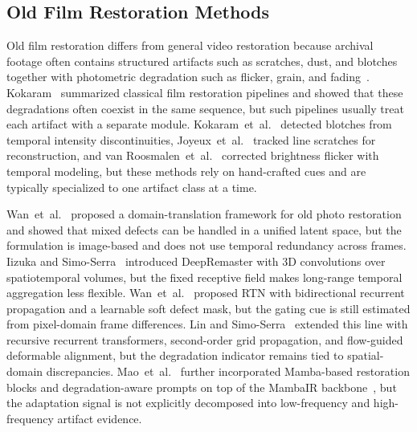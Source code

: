 \documentclass[applsci,article,submit,pdftex,moreauthors]{Definitions/mdpi}
\begin{document}
\subsection{Old Film Restoration Methods}

Old film restoration differs from general video restoration because archival footage often contains structured artifacts such as scratches, dust, and blotches together with photometric degradation such as flicker, grain, and fading~\cite{kokaram1998motion}. Kokaram~\cite{kokaram1998motion} summarized classical film restoration pipelines and showed that these degradations often coexist in the same sequence, but such pipelines usually treat each artifact with a separate module. Kokaram~et~al.~\cite{kokaram1995blotch} detected blotches from temporal intensity discontinuities, Joyeux~et~al.~\cite{joyeux2001scratch} tracked line scratches for reconstruction, and van Roosmalen~et~al.~\cite{vanroosmalen1999flicker} corrected brightness flicker with temporal modeling, but these methods rely on hand-crafted cues and are typically specialized to one artifact class at a time.

Wan~et~al.~\cite{wan2020bringing} proposed a domain-translation framework for old photo restoration and showed that mixed defects can be handled in a unified latent space, but the formulation is image-based and does not use temporal redundancy across frames. Iizuka and Simo-Serra~\cite{iizuka2019deepremaster} introduced DeepRemaster with 3D convolutions over spatiotemporal volumes, but the fixed receptive field makes long-range temporal aggregation less flexible. Wan~et~al.~\cite{rtn2022} proposed RTN with bidirectional recurrent propagation and a learnable soft defect mask, but the gating cue is still estimated from pixel-domain frame differences. Lin and Simo-Serra~\cite{rrtn2024} extended this line with recursive recurrent transformers, second-order grid propagation, and flow-guided deformable alignment, but the degradation indicator remains tied to spatial-domain discrepancies. Mao~et~al.~\cite{mao2025mambaofr} further incorporated Mamba-based restoration blocks and degradation-aware prompts on top of the MambaIR backbone~\cite{guo2024mambair}, but the adaptation signal is not explicitly decomposed into low-frequency and high-frequency artifact evidence.
\end{document}
